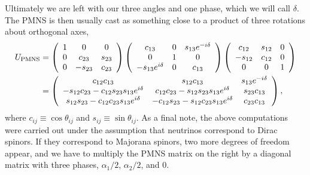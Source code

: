 Ultimately we are left with our three angles and one phase, which we will
call $\delta$. The PMNS is then usually cast as something close to a product
of three rotations about orthogonal axes,
\begin{equation}
  \begin{aligned}
    U_{\rm PMNS}&=
    \left(\begin{array}{ccc}
      1 & 0 & 0 \\
      0 & c_{23} & s_{23} \\
      0 & -s_{23} & c_{23}
    \end{array}\right)
    \left(\begin{array}{ccc}
      c_{13} & 0 & s_{13}e^{-i\delta} \\
      0 & 1 & 0 \\
      -s_{13}e^{i\delta} & 0 & c_{13}
    \end{array}\right)
    \left(\begin{array}{ccc}
      c_{12} & s_{12} & 0 \\
      -s_{12} & c_{12} & 0 \\
      0 & 0 & 1
    \end{array}\right)\\
    &=
    \left(\begin{array}{ccc}
      c_{12}c_{13} & s_{12}c_{13} & s_{13}e^{-i\delta} \\
      -s_{12}c_{23}-c_{12}s_{23}s_{13}e^{i\delta} 
       & c_{12}c_{23}-s_{12}s_{23}s_{13}e^{i\delta} & s_{23}c_{13} \\
      s_{12}s_{23}-c_{12}c_{23}s_{13}e^{i\delta} 
       & -c_{12}s_{23}-s_{12}c_{23}s_{13}e^{i\delta} & c_{23}c_{13}
    \end{array}\right),
  \end{aligned}
\end{equation}
where $c_{ij}\equiv \cos\theta_{ij}$ and
$s_{ij}\equiv \sin\theta_{ij}$. As a final note, the above computations
were carried out under the assumption that neutrinos correspond to Dirac
spinors. If they correspond to Majorana spinors, two more degrees of freedom
appear, and we have to multiply the PMNS matrix on the right by a diagonal
matrix with three phases, $\alpha_1/2$, $\alpha_2/2$, and 0.

